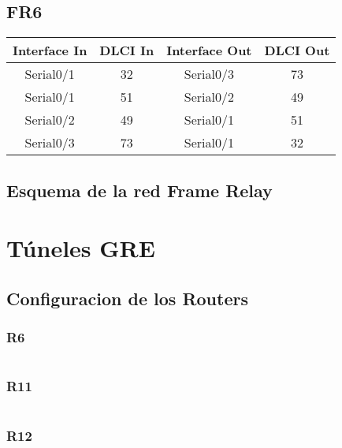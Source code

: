 \documentclass[12pt, a4paper, spanish]{article}
\begin{document}
\subsection{FR6}
\begin{center}
\begin{tabular}{|c|c|c|c|}
\hline
Interface In & DLCI In & Interface Out & DLCI Out \\
\hline
\hline
Serial0/1 & 32 & Serial0/3 & 73 \\
\hline
Serial0/1 & 51 & Serial0/2 & 49 \\
\hline
Serial0/2 & 49 & Serial0/1 & 51 \\
\hline
Serial0/3 & 73 & Serial0/1 & 32 \\
\hline
\end{tabular}
\end{center}

\newpage
\subsection{Esquema de la red Frame Relay}


\newpage
\section{Túneles GRE}
\subsection{Configuracion de los Routers}
\subsubsection{R6}
{\small
\begin{verbatim}

\end{verbatim}
}

\subsubsection{R11}
{\small
\begin{verbatim}

\end{verbatim}
}

\subsubsection{R12}
{\small
\begin{verbatim}

\end{verbatim}
}
\end{document}

